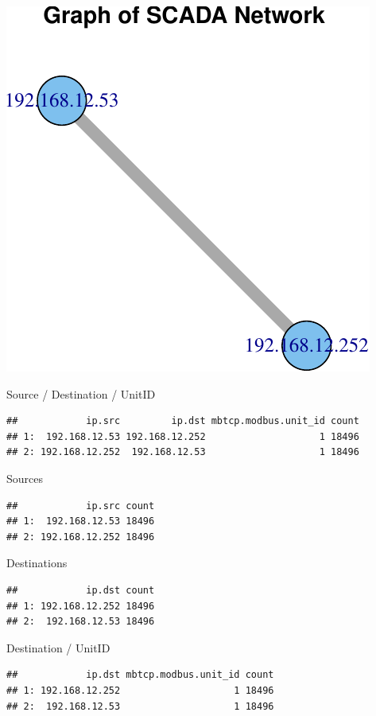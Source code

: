 \documentclass[]{article}
\begin{document}
\begin{center}\includegraphics{modbus_files/figure-latex/warning-1} \end{center}

Source / Destination / UnitID

\begin{verbatim}
##            ip.src         ip.dst mbtcp.modbus.unit_id count
## 1:  192.168.12.53 192.168.12.252                    1 18496
## 2: 192.168.12.252  192.168.12.53                    1 18496
\end{verbatim}

Sources

\begin{verbatim}
##            ip.src count
## 1:  192.168.12.53 18496
## 2: 192.168.12.252 18496
\end{verbatim}

Destinations

\begin{verbatim}
##            ip.dst count
## 1: 192.168.12.252 18496
## 2:  192.168.12.53 18496
\end{verbatim}

Destination / UnitID

\begin{verbatim}
##            ip.dst mbtcp.modbus.unit_id count
## 1: 192.168.12.252                    1 18496
## 2:  192.168.12.53                    1 18496
\end{verbatim}
\end{document}
